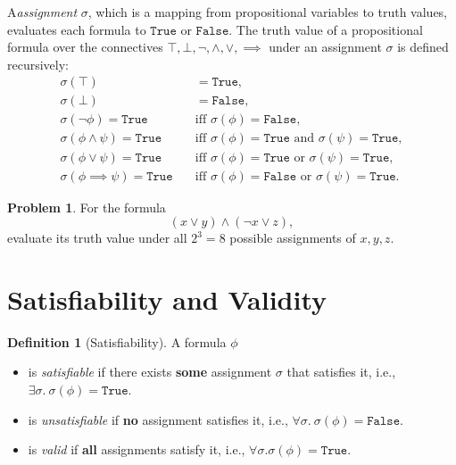 \documentclass[oneside,11pt,dvipsnames]{book}
\numberwithin{equation}{section}
\theoremstyle{definition}
\newtheorem{definition}{Definition}[section]
\newtheorem{problem}{Problem}[section]
\theoremstyle{remark}
\begin{document}
A\emph{assignment} $\sigma$, which is a mapping from propositional variables to truth values, evaluates each formula to $\texttt{True}$ or $\texttt{False}$.
The truth value of a propositional formula over the connectives $\top, \bot, \lnot, \land, \lor, \implies$ under an assignment $\sigma$
is defined recursively:
\begin{align*}
  \sigma(\top) &\quad = \texttt{True}, \\
  \sigma(\bot) &\quad = \texttt{False}, \\
  \sigma(\lnot{\phi}) = \texttt{True} &\quad \text{iff } \sigma(\phi) = \texttt{False}, \\
  \sigma(\phi \land \psi) = \texttt{True} &\quad \text{iff } \sigma(\phi) = \texttt{True} \text{ and } \sigma(\psi) = \texttt{True}, \\
  \sigma(\phi \lor \psi) = \texttt{True} &\quad \text{iff } \sigma(\phi) = \texttt{True} \text{ or } \sigma(\psi) = \texttt{True}, \\
  \sigma(\phi \implies \psi) = \texttt{True} &\quad \text{iff } \sigma(\phi) = \texttt{False} \text{ or } \sigma(\psi) = \texttt{True}.
\end{align*}

\begin{problem}
For the formula
\[
(x \lor y) \land (\lnot x \lor z),
\]
evaluate its truth value under all $2^3=8$ possible assignments of $x,y,z$.
\end{problem}

\section{Satisfiability and Validity}
\begin{definition}[Satisfiability]\label{def:sat-validity}
     A formula $\phi$

\begin{itemize}
  \item is \emph{satisfiable} if there exists \textbf{some} assignment $\sigma$ that satisfies it, i.e., $\exists \sigma.~ \sigma(\phi) = \texttt{True}$.
  \item is \emph{unsatisfiable} if \textbf{no} assignment satisfies it, i.e., $\forall \sigma.~\sigma(\phi) = \texttt{False}$.
  \item is \emph{valid} if \textbf{all} assignments satisfy it, i.e., $\forall \sigma. \sigma(\phi) = \texttt{True}$.
\end{itemize}
\end{definition}
\end{document}

